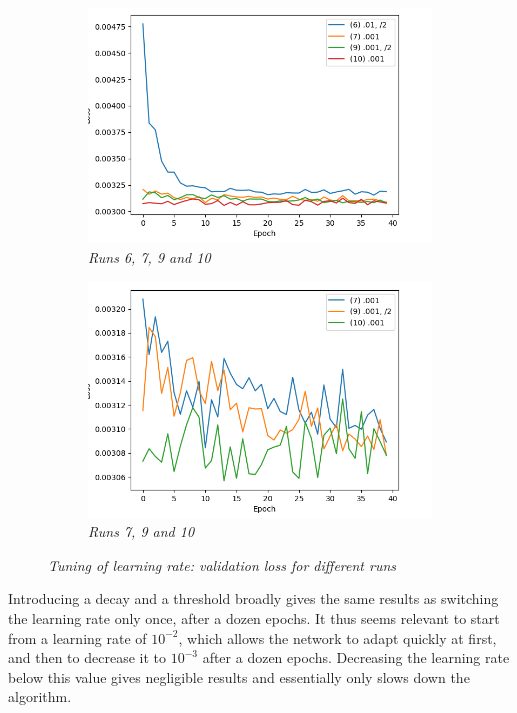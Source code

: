 \documentclass{article}
\begin{document}
\begin{figure}[!ht]
\begin{subfigure}{.49\linewidth}
                \centering
                \includegraphics[width=\linewidth]{pics/hpp-lr-loss-67910.png}
                \caption{\textit{Runs 6, 7, 9 and 10}}
            \end{subfigure}
            \begin{subfigure}{.49\linewidth}
                \centering
                \includegraphics[width=\linewidth]{pics/hpp-lr-loss-7910.png}
                \caption{\textit{Runs 7, 9 and 10}}
            \end{subfigure}
            \caption{\textit{Tuning of learning rate: validation loss for different runs}}
        \end{figure}
        \par
        Introducing a decay and a threshold broadly gives the same results as switching the learning rate only once, after a dozen epochs. It thus seems relevant to start from a learning rate of $10^{-2}$, which allows the network to adapt quickly at first, and then to decrease it to $10^{-3}$ after a dozen epochs. Decreasing the learning rate below this value gives negligible results and essentially only slows down the algorithm.
\end{document}
